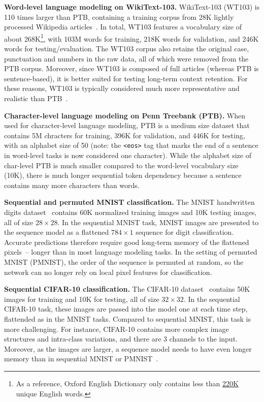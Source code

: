 \documentclass{article} \usepackage{iclr2019_conference,times}
\newcommand\mypara[1]{\vspace{0mm}\noindent\textbf{#1}}
\begin{document}
\mypara{Word-level language modeling on WikiText-103.}
WikiText-103 (WT103) is 110 times larger than PTB, containing a training corpus from 28K lightly processed Wikipedia articles~\citep{merity2016pointer}. In total, WT103 features a vocabulary size of about 268K\footnote{As a reference, Oxford English Dictionary only contains less than \href{https://en.oxforddictionaries.com/explore/how-many-words-are-there-in-the-english-language/}{220K} unique English words.}, with 103M words for training, 218K words for validation, and 246K words for testing/evaluation. The WT103 corpus also retains the original case, punctuation and numbers in the raw data, all of which were removed from the PTB corpus. Moreover, since WT103 is composed of full articles (whereas PTB is sentence-based), it is better suited for testing long-term context retention. For these reasons, WT103 is typically considered much more representative and realistic than PTB~\citep{merity2018analysis}.

\mypara{Character-level language modeling on Penn Treebank (PTB).}
When used for character-level language modeling, PTB is a medium size dataset that contains 5M chracters for training, 396K for validation, and 446K for testing, with an alphabet size of 50 (note: the \texttt{<eos>} tag that marks the end of a sentence in word-level tasks is now considered one character). While the alphabet size of char-level PTB is much smaller compared to the word-level vocabulary size (10K), there is much longer sequential token dependency because a sentence contains many more characters than words.

\mypara{Sequential and permuted MNIST classification.}
The MNIST handwritten digits dataset~\citep{LeCun1989} contains 60K normalized training images and 10K testing images, all of size $28 \times 28$. In the sequential MNIST task, MNIST images are presented to the sequence model as a flattened $784 \times 1$ sequence for digit classification. Accurate predictions therefore require good long-term memory of the flattened pixels~-- longer than in most language modeling tasks. In the setting of permuted MNIST (PMNIST), the order of the sequence is permuted at random, so the network can no longer rely on local pixel features for classification.

\mypara{Sequential CIFAR-10 classification.}
The CIFAR-10 dataset~\citep{krizhevsky2009learning} contains 50K images for training and 10K for testing, all of size $32 \times 32$. In the sequential CIFAR-10 task, these images are passed into the model one at each time step, flattended as in the MNIST tasks. Compared to sequential MNIST, this task is more challenging. For instance, CIFAR-10 contains more complex image structures and intra-class variations, and there are 3 channels to the input. Moreover, as the images are larger, a sequence model needs to have even longer memory than in sequential MNIST or PMNIST~\citep{trinh2018learning}.
\end{document}
